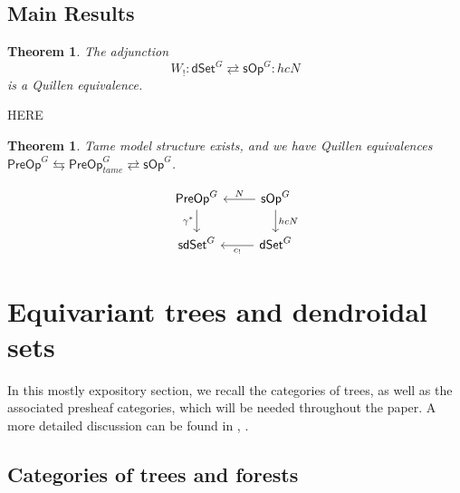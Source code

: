 \documentclass[a4paper,10pt
,draft
]{article}%
\numberwithin{equation}{section}
\numberwithin{figure}{section}
\newtheorem{theorem}[equation]{Theorem}%
\theoremstyle{definition} %
\newcommand{\sOp}{\ensuremath{\mathsf{sOp}}}%
\newcommand{\dSet}{\mathsf{dSet}}
\newcommand{\1}{\ensuremath{\mathbbm 1}}%
\begin{document}
\subsection{Main Results}




\begin{theorem}\label{QE THM}
The adjunction
\begin{equation}
      \label{QE_EQ}
      W_! \colon \dSet^G \rightleftarrows \sOp^G \colon hcN
\end{equation}
is a Quillen equivalence.
\end{theorem}


{\color{blue} HERE}



\begin{theorem}
	Tame model structure exists, and we have Quillen equivalences
	$\mathsf{PreOp}^G \leftrightarrows \mathsf{PreOp}^G_{tame} \rightleftarrows \sOp^G$.
\end{theorem}




\[
      \begin{tikzcd}
            \mathsf{PreOp}^G \ar{d}[swap]{\gamma^{\**}}&
            \mathsf{sOp}^G \ar{l}[swap]{N} \ar{d}{hcN}
            \\
            \mathsf{sdSet}^G &
            \mathsf{dSet}^G \ar{l}{c_{!}}
      \end{tikzcd}
\]





\newpage

\section{Equivariant trees and dendroidal sets}

In this mostly expository section, 
we recall the categories of trees,
as well as the associated presheaf categories,
which will be needed throughout the paper.
A more detailed discussion can be found in \cite{Per18}, \cite{BP_edss}.


\subsection{Categories of trees and forests}
\label{FORESTS_SEC}
\end{document}

